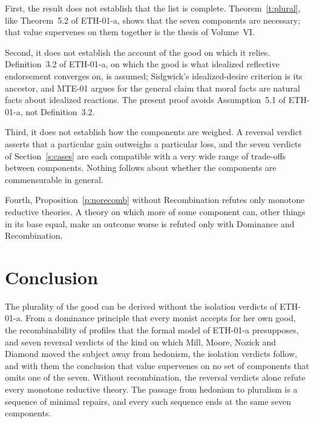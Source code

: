 \documentclass{situationist-preprint}
\begin{document}
First, the result does not establish that the list is complete. Theorem~\ref{t:plural}, like Theorem~5.2 of ETH-01-a, shows that the seven components are necessary; that value supervenes on them together is the thesis of Volume~VI.

Second, it does not establish the account of the good on which it relies. Definition~3.2 of ETH-01-a, on which the good is what idealized reflective endorsement converges on, is assumed; Sidgwick's idealized-desire criterion is its ancestor, and MTE-01 argues for the general claim that moral facts are natural facts about idealized reactions. The present proof avoids Assumption~5.1 of ETH-01-a, not Definition~3.2.

Third, it does not establish how the components are weighed. A reversal verdict asserts that a particular gain outweighs a particular loss, and the seven verdicts of Section~\ref{s:cases} are each compatible with a very wide range of trade-offs between components. Nothing follows about whether the components are commensurable in general.

Fourth, Proposition~\ref{p:norecomb} without Recombination refutes only monotone reductive theories. A theory on which more of some component can, other things in its base equal, make an outcome worse is refuted only with Dominance and Recombination.

\section{Conclusion}

The plurality of the good can be derived without the isolation verdicts of ETH-01-a. From a dominance principle that every monist accepts for her own good, the recombinability of profiles that the formal model of ETH-01-a presupposes, and seven reversal verdicts of the kind on which Mill, Moore, Nozick and Diamond moved the subject away from hedonism, the isolation verdicts follow, and with them the conclusion that value supervenes on no set of components that omits one of the seven. Without recombination, the reversal verdicts alone refute every monotone reductive theory. The passage from hedonism to pluralism is a sequence of minimal repairs, and every such sequence ends at the same seven components.
\end{document}
